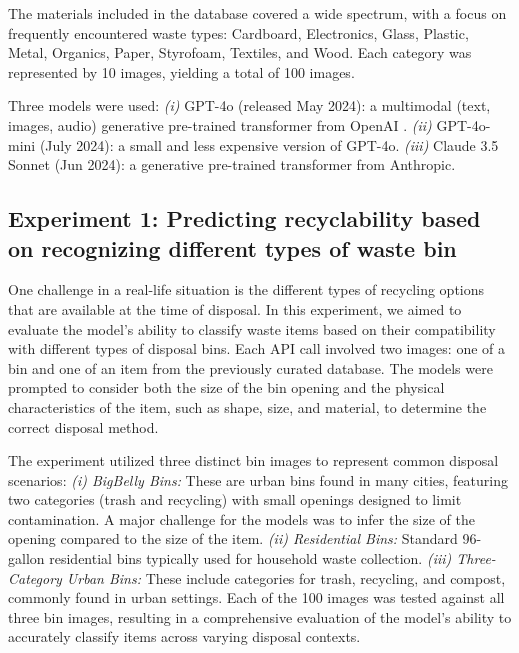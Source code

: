 \documentclass{article}
\begin{document}
The materials included in the database covered a wide spectrum, with a focus on frequently encountered waste types: Cardboard, Electronics, Glass, Plastic, Metal, Organics, Paper, Styrofoam, Textiles, and Wood. Each category was represented by 10 images, yielding a total of 100 images.

Three models were used: \textit{(i)} GPT-4o (released May 2024): a multimodal (text, images, audio) generative pre-trained transformer from OpenAI \cite{gpt4}. \textit{(ii)} GPT-4o-mini (July 2024): a small and less expensive version of GPT-4o. \textit{(iii)} Claude 3.5 Sonnet (Jun 2024): a generative pre-trained transformer from Anthropic.

\subsection{Experiment 1: Predicting recyclability based on recognizing different types of waste bin}
One challenge in a real-life situation is the different types of recycling options that are available at the time of disposal. In this experiment, we aimed to evaluate the model’s ability to classify waste items based on their compatibility with different types of disposal bins. Each API call involved two images: one of a bin and one of an item from the previously curated database. The models were prompted to consider both the size of the bin opening and the physical characteristics of the item, such as shape, size, and material, to determine the correct disposal method.

The experiment utilized three distinct bin images to represent common disposal scenarios: \textit{(i) BigBelly Bins:} These are urban bins found in many cities, featuring two categories (trash and recycling) with small openings designed to limit contamination. A major challenge for the models was to infer the size of the opening compared to the size of the item. \textit{(ii) Residential Bins:} Standard 96-gallon residential bins typically used for household waste collection. \textit{(iii) Three-Category Urban Bins:} These include categories for trash, recycling, and compost, commonly found in urban settings.  Each of the 100 images was tested against all three bin images, resulting in a comprehensive evaluation of the model’s ability to accurately classify items across varying disposal contexts. 
\end{document}
